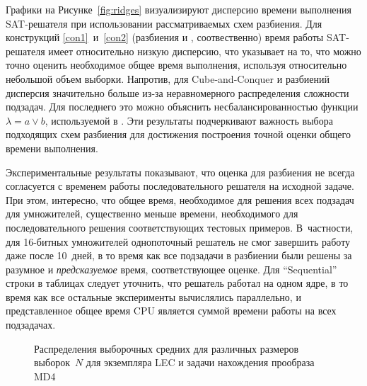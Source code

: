 Графики на Рисунке~\ref{fig:ridges} визуализируют дисперсию времени выполнения SAT-решателя при использовании рассматриваемых схем разбиения.
Для конструкций \ref{con1}~и~\ref{con2} (разбиения  и , соотвественно) время работы SAT-решателя имеет относительно низкую дисперсию, что указывает на то, что можно точно оценить необходимое общее время выполнения, используя относительно небольшой объем выборки.
Напротив, для Cube-and-Conquer и разбиений  дисперсия значительно больше из-за неравномерного распределения сложности подзадач.
Для последнего это можно объяснить несбалансированностью функции $\lambda = a \lor b$, используемой в .
Эти результаты подчеркивают важность выбора подходящих схем разбиения для достижения построения точной оценки общего времени выполнения.

Экспериментальные результаты показывают, что оценка для разбиения не всегда согласуется с временем работы последовательного решателя на исходной задаче.
При этом, интересно, что общее время, необходимое для решения всех подзадач для умножителей, существенно меньше времени, необходимого для последовательного решения соответствующих тестовых примеров.
В~частности, для 16-битных умножителей однопоточный решатель не смог завершить работу даже после 10~дней, в то время как все подзадачи в разбиении были решены за разумное и \emph{предсказуемое} время, соответствующее оценке.
Для \enquote{Sequential} строки в таблицах следует уточнить, что решатель работал на одном ядре, в то время как все остальные эксперименты вычислялись параллельно, и представленное общее время CPU является суммой времени работы на всех подзадачах.

\begin{figure*}[!htb]
    \centering
    \hfill
    \hfill
    \hfill
    \caption{Распределения выборочных средних для различных размеров выборок~$N$ для экземпляра LEC  и задачи нахождения прообраза MD4 }
    \label{fig:min-max-CvK-16-kissat}
\end{figure*}

